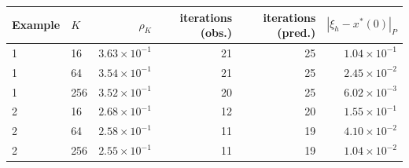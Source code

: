 \begin{tabular}{llrrrr}
\toprule
Example & $K$ & $\rho_K$ & iterations (obs.) & iterations (pred.) & $|\xi_h-x^\ast(0)|_P$\\
\midrule
1 & 16 & $3.63\times10^{-1}$ & 21 & 25 & $1.04\times10^{-1}$\\
1 & 64 & $3.54\times10^{-1}$ & 21 & 25 & $2.45\times10^{-2}$\\
1 & 256 & $3.52\times10^{-1}$ & 20 & 25 & $6.02\times10^{-3}$\\
2 & 16 & $2.68\times10^{-1}$ & 12 & 20 & $1.55\times10^{-1}$\\
2 & 64 & $2.58\times10^{-1}$ & 11 & 19 & $4.10\times10^{-2}$\\
2 & 256 & $2.55\times10^{-1}$ & 11 & 19 & $1.04\times10^{-2}$\\
\bottomrule
\end{tabular}